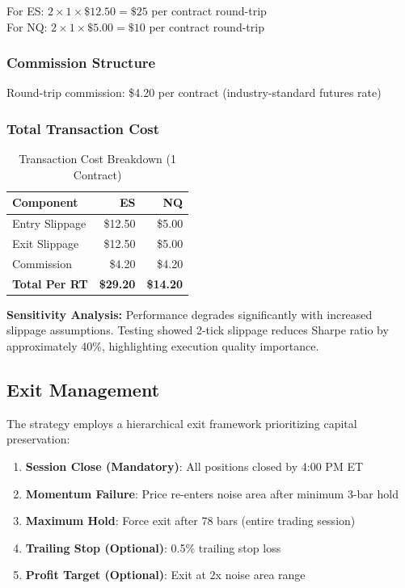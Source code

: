\documentclass[twocolumn,ieee]{arithmaxresearch}
\begin{document}
For ES: $2 \times 1 \times \$12.50 = \$25$ per contract round-trip \\
For NQ: $2 \times 1 \times \$5.00 = \$10$ per contract round-trip

\subsubsection{Commission Structure}

Round-trip commission: \$4.20 per contract (industry-standard futures rate)

\subsubsection{Total Transaction Cost}

\begin{table}[h]
\centering
\caption{Transaction Cost Breakdown (1 Contract)}
\label{tab:transaction_costs}
\begin{tabular}{@{}lrr@{}}
\toprule
\textbf{Component} & \textbf{ES} & \textbf{NQ} \\
\midrule
Entry Slippage & \$12.50 & \$5.00 \\
Exit Slippage & \$12.50 & \$5.00 \\
Commission & \$4.20 & \$4.20 \\
\midrule
\textbf{Total Per RT} & \textbf{\$29.20} & \textbf{\$14.20} \\
\bottomrule
\end{tabular}
\end{table}

\textbf{Sensitivity Analysis:} Performance degrades significantly with increased slippage assumptions. Testing showed 2-tick slippage reduces Sharpe ratio by approximately 40\%, highlighting execution quality importance.

\subsection{Exit Management}

The strategy employs a hierarchical exit framework prioritizing capital preservation:

\begin{enumerate}
    \item \textbf{Session Close (Mandatory)}: All positions closed by 4:00 PM ET
    \item \textbf{Momentum Failure}: Price re-enters noise area after minimum 3-bar hold
    \item \textbf{Maximum Hold}: Force exit after 78 bars (entire trading session)
    \item \textbf{Trailing Stop (Optional)}: 0.5\% trailing stop loss
    \item \textbf{Profit Target (Optional)}: Exit at 2x noise area range
\end{enumerate}
\end{document}
